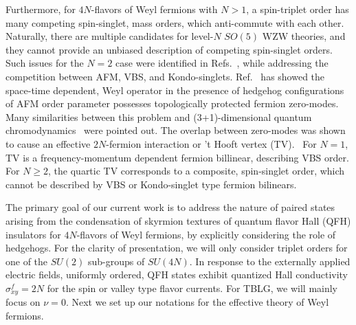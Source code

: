 \documentclass[aps,prb,amsmath,amssymb,floatfix,twocolumn]{revtex4}
\begin{document}
Furthermore, for $4N$-flavors of Weyl fermions with $N>1$, a spin-triplet order has many competing spin-singlet, mass orders, which anti-commute with each other. Naturally, there are multiple candidates for level-$N$ $SO(5)$ WZW theories, and they cannot provide an unbiased description of competing spin-singlet orders. Such issues for the $N=2$ case were identified in Refs.~, while addressing the competition between AFM, VBS, and Kondo-singlets. Ref.~ has showed the space-time dependent, Weyl operator in the presence of hedgehog configurations of AFM order parameter possesses topologically protected fermion zero-modes. Many similarities between this problem and (3+1)-dimensional quantum chromodynamics~\cite{Shuryak,Diakonov} were pointed out. The overlap between zero-modes was shown to cause an effective $2N$-fermion interaction or 't Hooft vertex (TV).~\cite{'T Hooft} For $N=1$, TV is a frequency-momentum dependent fermion billinear, describing VBS order. For $N \geq 2$, the quartic TV corresponds to a composite, spin-singlet order, which cannot be described by VBS or Kondo-singlet type fermion bilinears. 

The primary goal of our current work is to address the nature of paired states arising from the condensation of skyrmion textures of quantum flavor Hall (QFH) insulators for $4N$-flavors of Weyl fermions, by explicitly considering the role of hedgehogs. For the clarity of presentation, we will only consider triplet orders for one of the $SU(2)$ sub-groups of $SU(4N)$. In response to the externally applied electric fields, uniformly ordered, QFH states exhibit quantized Hall conductivity $\sigma^f_{xy}=2N$ for the spin or valley type flavor currents. For TBLG, we will mainly focus on $\nu=0$. Next we set up our notations for the effective theory of Weyl fermions.
\end{document}

